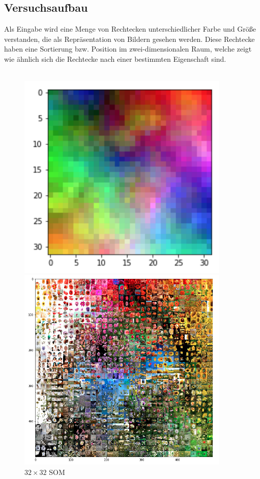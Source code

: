 \documentclass[12pt, ngerman, utf8]{article}
\begin{document}
\subsection{Versuchsaufbau}
Als Eingabe wird eine Menge von Rechtecken unterschiedlicher Farbe und Größe verstanden, die als Repräsentation von Bildern gesehen werden. Diese Rechtecke haben eine Sortierung bzw. Position im zwei-dimensionalen Raum, welche zeigt wie ähnlich sich die Rechtecke nach einer bestimmten Eigenschaft sind.\\\\
\begin{figure}[h]
\centering
\begin{minipage}{.40\textwidth}
  \centering
  \includegraphics[width=0.9\textwidth]{./imgs/32mal32-som.png}
  \caption{$32\times32$ SOM}
  \label{fig:32som}
\end{minipage}%
\hfill
\begin{minipage}{.55\textwidth}
  \centering
  \includegraphics[width=0.9\textwidth]{./imgs/32x32-flowers.png}

\end{minipage}
\end{figure}
\end{document}
